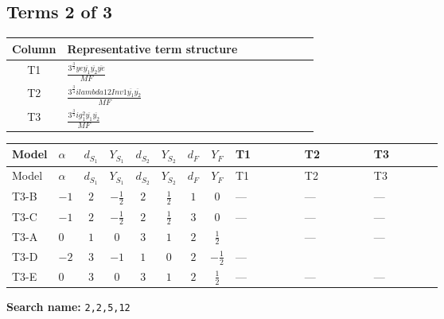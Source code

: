 \documentclass[8pt]{article}
\begin{document}
\begin{landscape}
\subsection*{Terms 2 of 3}
\begin{center}
\begin{tabular}{@{}c >{\raggedright\arraybackslash}p{0.82\linewidth}@{}}
\toprule
Column & Representative term structure \\
\midrule
T1 & \(\displaystyle \frac{3^{\frac{3}{4}} ye \overline{y_{1}} \overline{y_{2}} \overline{ye}}{MF}\) \\
\midrule
T2 & \(\displaystyle \frac{3^{\frac{3}{4}} i lambda12Inv1 \overline{y_{1}} \overline{y_{2}}}{MF}\) \\
\midrule
T3 & \(\displaystyle \frac{3^{\frac{3}{4}} i g_{1}^{2} \overline{y_{1}} \overline{y_{2}}}{MF}\) \\
\midrule
\bottomrule
\end{tabular}
\end{center}
\smallskip
\tiny
\begin{longtable}{@{}llcccccc >{\raggedright\arraybackslash}p{0.21\linewidth} >{\raggedright\arraybackslash}p{0.21\linewidth} >{\raggedright\arraybackslash}p{0.21\linewidth}@{}}
\toprule
Model & $\alpha$ & $d_{S_1}$ & $Y_{S_1}$ & $d_{S_2}$ & $Y_{S_2}$ & $d_F$ & $Y_F$ & T1 & T2 & T3 \\
\midrule
\endfirsthead
\toprule
Model & $\alpha$ & $d_{S_1}$ & $Y_{S_1}$ & $d_{S_2}$ & $Y_{S_2}$ & $d_F$ & $Y_F$ & T1 & T2 & T3 \\
\midrule
\endhead
T3-B & $-1$ & $2$ & $-\frac{1}{2}$ & $2$ & $\frac{1}{2}$ & $1$ & $0$ & --- & --- & --- \\
\midrule
T3-C & $-1$ & $2$ & $-\frac{1}{2}$ & $2$ & $\frac{1}{2}$ & $3$ & $0$ & --- & --- & --- \\
\midrule
T3-A & $0$ & $1$ & $0$ & $3$ & $1$ & $2$ & $\frac{1}{2}$ & \scriptsize\adjustbox{max width=\linewidth}{$\begin{gathered} - \frac{3^{\frac{3}{4}} ye \overline{y_{1}} \overline{y_{2}} \overline{ye}}{12 MF}\end{gathered}$} & --- & --- \\
\midrule
T3-D & $-2$ & $3$ & $-1$ & $1$ & $0$ & $2$ & $-\frac{1}{2}$ & --- & \scriptsize\adjustbox{max width=\linewidth}{$\begin{gathered} \frac{3^{\frac{3}{4}} i lambda12Inv1 \overline{y_{1}} \overline{y_{2}}}{6 MF}\end{gathered}$} & \scriptsize\adjustbox{max width=\linewidth}{$\begin{gathered} \frac{3^{\frac{3}{4}} i g_{1}^{2} \overline{y_{1}} \overline{y_{2}}}{8 MF}\end{gathered}$} \\
\midrule
T3-E & $0$ & $3$ & $0$ & $3$ & $1$ & $2$ & $\frac{1}{2}$ & --- & --- & --- \\
\midrule
\bottomrule
\end{longtable}
\clearpage
\noindent\textbf{Search name: }\texttt{2,2,5,12}\par\smallskip

\end{landscape}
\end{document}
